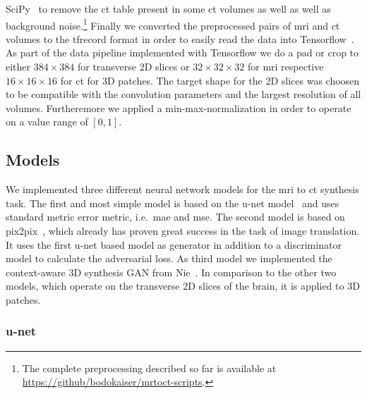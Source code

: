 SciPy~\cite{SciPy} to remove the \gls{ct} table present in some \gls{ct}
volumes as well as well as background noise.\footnote{The complete
preprocessing described so far is available at
\url{https://github/bodokaiser/mrtoct-scripts}.} Finally we converted the
preprocessed pairs of \gls{mri} and \gls{ct} volumes to the tfrecord format
in order to easily read the data into Tensorflow~\cite{Tensorflow15}. As part
of the data pipeline implemented with Tensorflow we do a pad or crop to either
$384\times384$ for transverse 2D slices or $32\times32\times32$ for \gls{mri}
respective $16\times16\times16$ for \gls{ct} for 3D patches. The target shape
for the 2D slices was choosen to be compatible with the convolution parameters
and the largest resolution of all volumes. Furtheremore we applied a
min-max-normalization in order to operate on a value range of $[0,1]$.

\subsection{Models}

We implemented three different neural network models for the \gls{mri} to
\gls{ct} synthesis task. The first and most simple model is based on the
u-net model~\cite{Ronneberger15} and uses standard metric error metric,
i.e.\ \gls{mae} and \gls{mse}. The second model is based on
pix2pix~\cite{Isola16}, which already has proven great success in the task
of image translation. It uses the first u-net based model as generator in
addition to a discriminator model to calculate the adversarial loss. As third
model we implemented the context-aware 3D synthesis GAN from Nie~\cite{Nie16}.
In comparison to the other two models, which operate on the transverse 2D
slices of the brain, it is applied to 3D patches.

\subsubsection{u-net}

